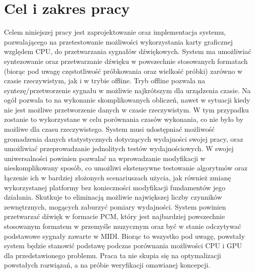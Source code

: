 \chapter*{Cel i zakres pracy}

Celem niniejszej pracy jest zaprojektowanie oraz implementacja systemu, pozwalającego na przetestowanie możliwości wykorzystania karty graficznej względem CPU, do przetwarzania sygnałów dźwiękowych. System ma umożliwiać syntezowanie oraz przetwarzanie dźwięku w powszechnie stosowanych formatach (biorąc pod uwagę częstotliwość próbkowania oraz wielkość próbki) zarówno w czasie rzeczywistym, jak i w trybie offline. Tryb offline pozwala na syntezę/przetworzenie sygnału w możliwie najkrótszym dla urządzenia czasie. Na ogół pozwala to na wykonanie skomplikowanych obliczeń, nawet w sytuacji kiedy nie jest możliwe przetworzenie danych w czasie rzeczywistym. W tym przypadku zostanie to wykorzystane w celu porównania czasów wykonania, co nie było by możliwe dla czasu rzeczywistego. System musi udostępniać możliwość gromadzenia danych statystycznych dotyczących wydajności swojej pracy, oraz umożliwiać przeprowadzanie jednolitych testów wydajnościowych. W swojej uniwersalności powinien pozwalać na wprowadzanie modyfikacji w nieskomplikowany sposób, co umożliwi ekstensywne testowanie algorytmów oraz łączenie ich w bardziej złożonych scenariuszach użycia, jak również zmianę wykorzystanej platformy bez konieczności modyfikacji fundamentów jego działania. Skutkuje to eliminacją możliwie największej liczby czynników zewnętrznych, mogących zaburzyć pomiary wydajności. System powinien przetwarzać dźwięk w formacie PCM, który jest najbardziej powszechnie stosowanym formatem w przemyśle muzycznym oraz być w stanie odczytywać podstawowe sygnały zawarte w MIDI. Biorąc to wszystko pod uwagę, powstały system będzie stanowić podstawę podczas porównania możliwości CPU i GPU dla przedstawionego problemu. Praca ta nie skupia się na optymalizacji powstałych rozwiązań, a na próbie weryfikacji omawianej koncepcji.
